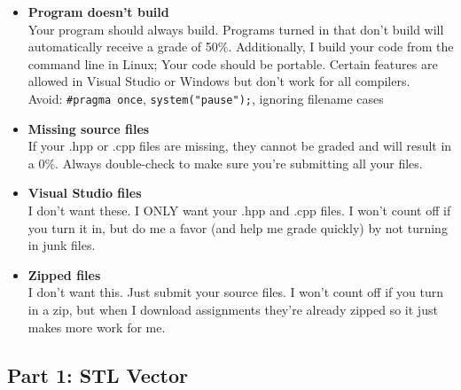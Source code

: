 \documentclass[a4paper,12pt]{book}
\begin{document}
                \begin{itemize}
                    \item   \textbf{Program doesn't build}
                        \\ Your program should always build. Programs turned in that don't build will automatically receive a grade of 50\%.{}
                            Additionally, I build your code from the command line in Linux; Your code should be portable. Certain features
                            are allowed in Visual Studio or Windows but don't work for all compilers. \\
                            \footnotesize Avoid: \texttt{\#pragma once}, \texttt{system("pause");}, ignoring filename cases
                            \normalsize 
                    \item   \textbf{Missing source files}
                        \\ If your .hpp or .cpp files are missing, they cannot be graded and will result in a 0\%. Always double-check to make sure you're submitting all your files.
                    \item   \textbf{Visual Studio files}
                        \\ I don't want these. I ONLY want your .hpp and .cpp files. I won't count off if you turn it in, but do me a favor (and help me grade quickly) by not turning in junk files.
                    \item   \textbf{Zipped files}
                        \\ I don't want this. Just submit your source files. I won't count off if you turn in a zip, but when I download assignments they're already zipped so it just makes more work for me.
                \end{itemize}

            \subsection*{Part 1: STL Vector}
            
\end{document}
